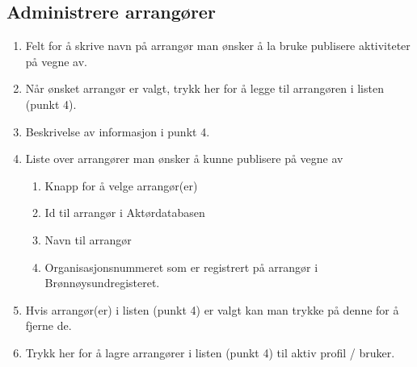 \subsection{Administrere arrangører}
\begin{center}
\end{center}
\begin{enumerate}[nosep]
    \item Felt for å skrive navn på arrangør man ønsker å la bruke publisere aktiviteter på vegne av.
    \item Når ønsket arrangør er valgt, trykk her for å legge til arrangøren i listen (punkt 4).
    \item Beskrivelse av informasjon i punkt 4.
    \item Liste over arrangører man ønsker å kunne publisere på vegne av
    \begin{enumerate}
        \item Knapp for å velge arrangør(er)
        \item Id til arrangør i Aktørdatabasen
        \item Navn til arrangør
        \item Organisasjonsnummeret som er registrert på arrangør i Brønnøysundregisteret.
    \end{enumerate}
    \item Hvis arrangør(er) i listen (punkt 4) er valgt kan man trykke på denne for å fjerne de.
    \item Trykk her for å lagre arrangører i listen (punkt 4) til aktiv profil / bruker. 
\end{enumerate}

